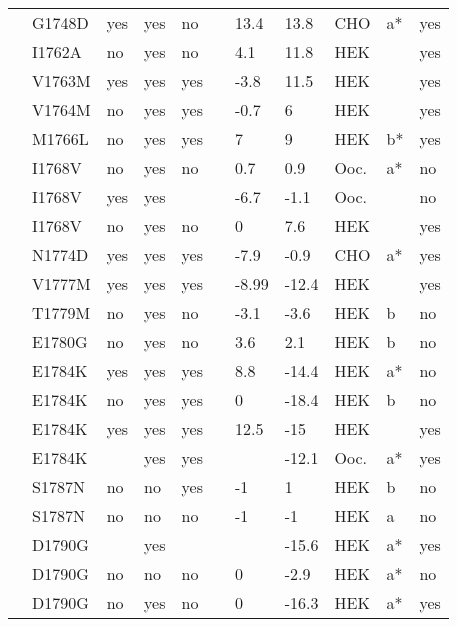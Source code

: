 \begin{tiny}
\begin{longtable}{p{4cm}|l|llll|ll|lll}
\citet{Nunez2013MutationDB} & G1748D & yes & yes & no &  & 13.4 & 13.8 & CHO & a* & yes \\
\citet{Chang2004MutationDB} & I1762A & no & yes & no &  & 4.1 & 11.8 & HEK &  & yes \\
\citet{Chang2004MutationDB} & V1763M & yes & yes & yes &  & -3.8 & 11.5 & HEK &  & yes \\
\citet{Chang2004MutationDB} & V1764M & no & yes & yes &  & -0.7 & 6 & HEK &  & yes \\
\citet{Valdivia2002MutationDB} & M1766L & no & yes & yes &  & 7 & 9 & HEK & b* & yes \\
\citet{Groenewegen2003bMutationDB} & I1768V & no & yes & no &  & 0.7 & 0.9 & Ooc. & a* & no \\
\citet{Kauferstein2013aMutationDB} & I1768V & yes & yes &  &  & -6.7 & -1.1 & Ooc. &  & no \\
\citet{Rivolta2002MutationDB} & I1768V & no & yes & no &  & 0 & 7.6 & HEK &  & yes \\
\citet{Kato2014MutationDB} & N1774D & yes & yes & yes &  & -7.9 & -0.9 & CHO & a* & yes \\
\citet{Lupoglazoff2001MutationDB} & V1777M & yes & yes & yes &  & -8.99 & -12.4 & HEK &  & yes \\
\citet{Kapplinger2015MutationDB} & T1779M & no & yes & no &  & -3.1 & -3.6 & HEK & b & no \\
\citet{Beyder2014MutationDB} & E1780G & no & yes & no &  & 3.6 & 2.1 & HEK & b & no \\
\citet{Deschenes2000MutationDB} & E1784K & yes & yes & yes &  & 8.8 & -14.4 & HEK & a* & no \\
\citet{Hu2014MutationDB} & E1784K & no & yes & yes &  & 0 & -18.4 & HEK & b & no \\
\citet{Makita2008MutationDB} & E1784K & yes & yes & yes &  & 12.5 & -15 & HEK &  & yes \\
\citet{Wei1999MutationDB} & E1784K &  & yes & yes &  &  & -12.1 & Ooc. & a* & yes \\
\citet{Hu2015MutationDB} & S1787N & no & no & yes &  & -1 & 1 & HEK & b & no \\
\citet{Hu2015MutationDB} & S1787N & no & no & no &  & -1 & -1 & HEK & a & no \\
\citet{Abriel2000MutationDB} & D1790G &  & yes &  &  &  & -15.6 & HEK & a* & yes \\
\citet{An1998MutationDB} & D1790G & no & no & no &  & 0 & -2.9 & HEK & a* & no \\
\citet{An1998MutationDB} & D1790G & no & yes & no &  & 0 & -16.3 & HEK & a* & yes \\

\end{longtable}
\end{tiny}
